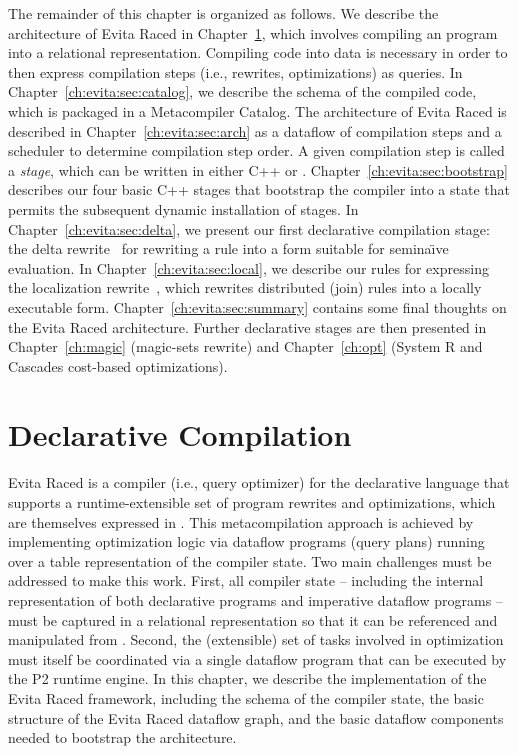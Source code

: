 The remainder of this chapter is organized as follows.  We describe the
architecture of Evita Raced in Chapter~\ref{ch:evita:sec:compile}, which
involves compiling an \OVERLOG program into a relational representation.
Compiling code into data is necessary in order to then express compilation
steps (i.e., rewrites, optimizations) as queries.  In
Chapter~\ref{ch:evita:sec:catalog}, we describe the schema of the compiled
code, which is packaged in a Metacompiler Catalog.  The architecture of Evita
Raced is described in Chapter~\ref{ch:evita:sec:arch} as a dataflow of
compilation steps and a scheduler to determine compilation step order.  A given
compilation step is called a {\em stage}, which can be written in either C++ or
\OVERLOG.  Chapter~\ref{ch:evita:sec:bootstrap} describes our four basic C++
stages that bootstrap the compiler into a state that permits the subsequent
dynamic installation of \OVERLOG stages.  In Chapter~\ref{ch:evita:sec:delta},
we present our first declarative compilation stage: the delta
rewrite~\cite{loo-sigmod06} for rewriting a rule into a form suitable for
semina\"{\i}ve evaluation.  In Chapter~\ref{ch:evita:sec:local}, we describe
our \OVERLOG rules for expressing the localization rewrite~\cite{p2:sosp},
which rewrites distributed (join) rules into a locally executable form.
Chapter~\ref{ch:evita:sec:summary} contains some final thoughts on the Evita
Raced architecture.  Further declarative stages are then presented in
Chapter~\ref{ch:magic} (magic-sets rewrite) and Chapter~\ref{ch:opt} (System R
and Cascades cost-based optimizations).

\section{Declarative Compilation}
\label{ch:evita:sec:compile}

Evita Raced is a compiler (i.e., query optimizer) for the \OVERLOG declarative
language that supports a runtime-extensible set of program rewrites and
optimizations, which are themselves expressed in \OVERLOG.  This
metacompilation approach is achieved by implementing optimization logic via
dataflow programs (query plans) running over a table representation of the
compiler state.  Two main challenges must be addressed to make this work.
First, all compiler state -- including the internal representation of both
declarative \OVERLOG programs and imperative dataflow programs -- must be
captured in a relational representation so that it can be referenced and
manipulated from \OVERLOG.  Second, the (extensible) set of tasks involved in
optimization must itself be coordinated via a single dataflow program that can
be executed by the P2 runtime engine.  In this chapter, we describe the
implementation of the Evita Raced framework, including the schema of the
compiler state, the basic structure of the Evita Raced dataflow graph, and the
basic dataflow components needed to bootstrap the architecture.

